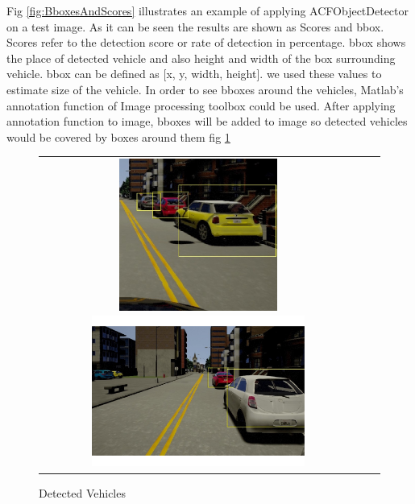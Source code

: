 Fig \ref{fig:BboxesAndScores} illustrates an example of applying ACFObjectDetector on a test image. As it can be seen the results are shown as Scores and \acrshort{bbox}. Scores refer to the detection score or rate of detection in percentage. \acrshort{bbox} shows the place of detected vehicle and also height and width of the box surrounding vehicle. \acrshort{bbox} can be defined as [x, y, width, height]. we used these values to estimate size of the vehicle. In order to see bboxes around the vehicles, Matlab's annotation function of Image processing toolbox could be used. After applying annotation function to image, bboxes will be added to image so detected vehicles would be covered by boxes around them fig \ref{fig:detectionSamples}
\begin{figure}
\centering
    \begin{tabular}{c|c|c}
         \includegraphics[width=7cm, height=5cm]{images/acf.jpg} 
         \includegraphics[width=7cm, height=5cm]{images/test4ACFview.pdf}

    \end{tabular}
    \caption{Detected Vehicles}
    \label{fig:detectionSamples}
\end{figure}
